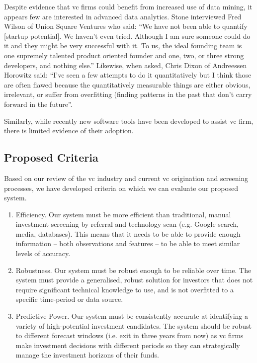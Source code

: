 \documentclass[../thesis/thesis.tex]{subfiles}
\begin{document}
Despite evidence that \gls{vc} firms could benefit from increased use of data mining, it appears few are interested in advanced data analytics. Stone \cite{stone2014} interviewed Fred Wilson of Union Square Ventures who said: ``We have not been able to quantify [startup potential]. We haven’t even tried. Although I am sure someone could do it and they might be very successful with it. To us, the ideal founding team is one supremely talented product oriented founder and one, two, or three strong developers, and nothing else.'' Likewise, when asked, Chris Dixon of Andreessen Horowitz said: ``I’ve seen a few attempts to do it quantitatively but I think those are often flawed because the quantitatively measurable things are either obvious, irrelevant, or suffer from overfitting (finding patterns in the past that don’t carry forward in the future''.

Similarly, while recently new software tools have been developed to assist \gls{vc} firm, there is limited evidence of their adoption.

\subsection{Proposed Criteria}

Based on our review of the \gls{vc} industry and current \gls{vc} origination and screening processes, we have developed criteria on which we can evaluate our proposed system.

\begin{enumerate}

\item Efficiency. Our system must be more efficient than traditional, manual investment screening by referral and technology scan (e.g. Google search, media, databases). This means that it needs to be able to provide enough information -- both observations and features -- to be able to meet similar levels of accuracy.

\item Robustness. Our system must be robust enough to be reliable over time. The system must provide a generalised, robust solution for investors that does not require significant technical knowledge to use, and is not overfitted to a specific time-period or data source.

\item Predictive Power. Our system must be consistently accurate at identifying a variety of high-potential investment candidates. The system should be robust to different forecast windows (i.e. exit in three years from now) as \gls{vc} firms make investment decisions with different periods so they can strategically manage the investment horizons of their funds.

\end{enumerate}
\end{document}
